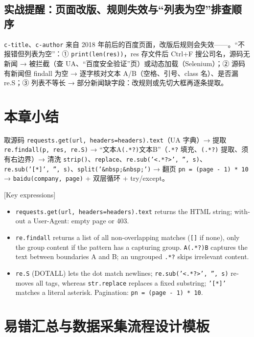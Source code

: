 \subsection{实战提醒：页面改版、规则失效与“列表为空”排查顺序}
\texttt{c-title}、\texttt{c-author} 来自 2018 年前后的百度页面，改版后规则会失效——。“不报错但列表为空”：① \texttt{print(len(res))}，res 存文件后 Ctrl+F 搜公司名，源码无新闻 → 被拦截（查 UA、“百度安全验证”页）或动态加载（Selenium）；② 源码有新闻但 findall 为空 → 逐字核对文本 A/B（空格、引号、class 名）、是否漏 re.S；③ 列表不等长 → 部分新闻缺字段：改规则或先切大框再逐条提取。

\section{本章小结}
\begin{summary}[核心代码清单]
取源码 \texttt{requests.get(url, headers=headers).text}（UA 字典）→ 提取 \texttt{re.findall(p, res, re.S)} → “文本A\texttt{(.*?)}文本B”（\texttt{.*?} 填充、\texttt{(.*?)} 提取、须有右边界）→ 清洗 \texttt{strip()}、\texttt{replace}、\texttt{re.sub('<.*?>', '', s)}、\texttt{re.sub('[*]', '', s)}、\texttt{split('\&nbsp;\&nbsp;')} → 翻页 \texttt{pn = (page - 1) * 10} → \texttt{baidu(company, page)} + 双层循环 + try/except。
\end{summary}
\begin{english}[Key expressions]
\footnotesize
\begin{itemize}
\item \texttt{requests.get(url, headers=headers).text} returns the HTML string; without a User-Agent: empty page or 403.
\item \texttt{re.findall} returns a list of all non-overlapping matches (\texttt{[]} if none), only the group content if the pattern has a capturing group. \texttt{A(.*?)B} captures the text between boundaries A and B; an ungrouped \texttt{.*?} skips irrelevant content.
\item \texttt{re.S} (DOTALL) lets the dot match newlines; \texttt{re.sub('<.*?>', '', s)} removes all tags, whereas \texttt{str.replace} replaces a fixed substring; \texttt{'[*]'} matches a literal asterisk. Pagination: \texttt{pn = (page - 1) * 10}.
\end{itemize}
\end{english}

\section{易错汇总与数据采集流程设计模板}

